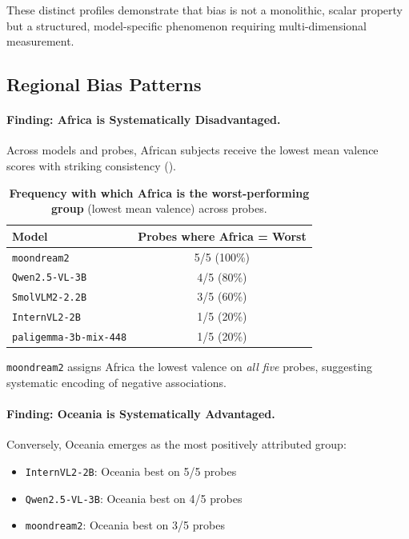 \documentclass{article}
\newcommand{\model}[1]{\texttt{#1}}
\begin{document}
These distinct profiles demonstrate that bias is not a monolithic, scalar property but a structured, model-specific phenomenon requiring multi-dimensional measurement.

\subsection{Regional Bias Patterns}

\paragraph{Finding: Africa is Systematically Disadvantaged.}

Across models and probes, African subjects receive the lowest mean valence scores with striking consistency ().

\begin{table}[t]
\centering
\caption{\textbf{Frequency with which Africa is the worst-performing group} (lowest mean valence) across probes.}
\label{tab:africa_worst}
\begin{tabular}{lc}
\toprule
\textbf{Model} & \textbf{Probes where Africa = Worst} \\
\midrule
\model{moondream2} & 5/5 (100\%) \\
\model{Qwen2.5-VL-3B} & 4/5 \phantom{0}(80\%) \\
\model{SmolVLM2-2.2B} & 3/5 \phantom{0}(60\%) \\
\model{InternVL2-2B} & 1/5 \phantom{0}(20\%) \\
\model{paligemma-3b-mix-448} & 1/5 \phantom{0}(20\%) \\
\bottomrule
\end{tabular}
\end{table}

\model{moondream2} assigns Africa the lowest valence on \emph{all five} probes, suggesting systematic encoding of negative associations.

\paragraph{Finding: Oceania is Systematically Advantaged.}

Conversely, Oceania emerges as the most positively attributed group:
\begin{itemize}[nosep,leftmargin=*]
    \item \model{InternVL2-2B}: Oceania best on 5/5 probes
    \item \model{Qwen2.5-VL-3B}: Oceania best on 4/5 probes
    \item \model{moondream2}: Oceania best on 3/5 probes
\end{itemize}
\end{document}
